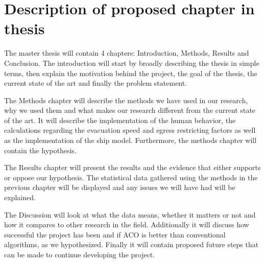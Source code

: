 \chapter{Description of proposed chapter in thesis}
\label{ch:discription}


The master thesis will contain 4 chapters: Introduction, Methods, Results and Conclusion.
The introduction will start by broadly describing the thesis in simple terms, then explain the motivation behind the project,
the goal of the thesis, the current state of the art and finally the problem statement. 

The Methods chapter will describe the methods we have used in our research, why we used them and what makes
our research different from the current state of the art. It will describe the implementation of the human behavior,
the calculations regarding the evacuation speed and egress restricting factors as well as the implementation of the 
ship model. Furthermore, the methods chapter will contain the hypothesis.

The Results chapter will present the results and the evidence that either supports or oppose our hypothesis. The
statistical data gathered using the methods in the previous chapter will be displayed and any issues we will have had
will be explained.

The Discussion will look at what the data means, whether it matters or not and how it compares to other research in the field.
Additionally it will discuss how successful the project has been and if ACO is better than conventional algorithms, as we hypothesized.
Finally it will contain proposed future steps that can be made to continue developing the project.